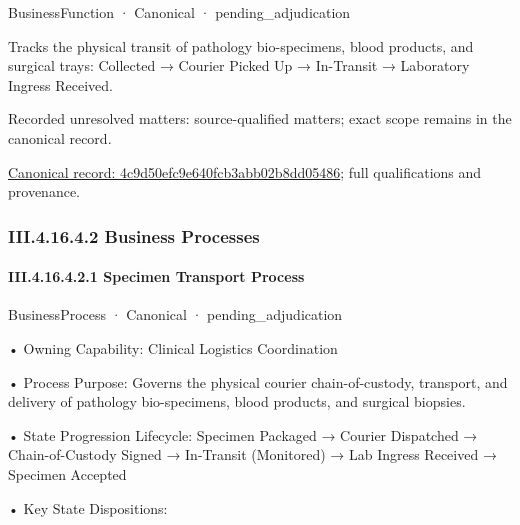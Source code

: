 \label{element:4c9d50efc9e640fcb3abb02b8dd05486}
{\small BusinessFunction · Canonical · pending\_adjudication}\par

Tracks the physical transit of pathology bio-specimens, blood products, and surgical trays: Collected → Courier Picked Up → In-Transit → Laboratory Ingress Received.


{\small Recorded unresolved matters: source-qualified matters; exact scope remains in the canonical record.}\par
{\footnotesize \href{../../../../../../../../continuum/business/business-function/4c9d50efc9e640fcb3abb02b8dd05486.md}{Canonical record: 4c9d50efc9e640fcb3abb02b8dd05486}; full qualifications and provenance.}\par
\subsubsection*{III.4.16.4.2 Business Processes}
\label{navigation:III.4.16.4.2}

\paragraph*{III.4.16.4.2.1 Specimen Transport Process}
\label{navigation:III.4.16.4.2.1}

\label{element:11bb000294fc44a8af295f4682e2fe6c}
{\small BusinessProcess · Canonical · pending\_adjudication}\par

•
Owning Capability: Clinical Logistics Coordination



•
Process Purpose: Governs the physical courier chain-of-custody, transport, and delivery of pathology bio-specimens, blood products, and surgical biopsies.



•
State Progression Lifecycle: Specimen Packaged → Courier Dispatched → Chain-of-Custody Signed → In-Transit (Monitored) → Lab Ingress Received → Specimen Accepted



•
Key State Dispositions:



